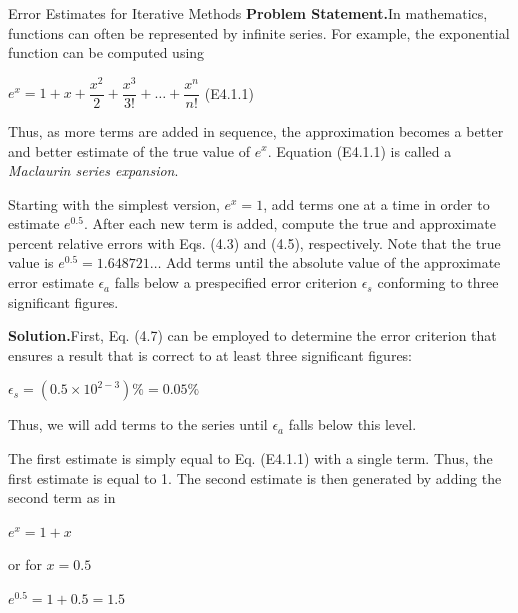 \documentclass[../main.tex]{subfiles}
\begin{document}
\begin{example} Error Estimates for Iterative Methods
    \bigskip
    \newline
    \textbf{Problem Statement.}\quad In mathematics, functions can often be represented by infinite series.
    For example, the exponential function can be computed using
    \newline
    
    $e^x = 1+x+\dfrac{x^2}{2}+\dfrac{x^3}{3!}+\hdots+\dfrac{x^n}{n!}$
    \hfill (E4.1.1)
    \newline

    \noindent
    Thus, as more terms are added in sequence, the approximation becomes a better and better
    estimate of the true value of $e^x$. Equation (E4.1.1) is called a \emph{Maclaurin series expansion}.

    Starting with the simplest version, $e^x = 1$, add terms one at a time in order to estimate
    $e^{0.5}$. After each new term is added, compute the true and approximate percent relative errors
    with Eqs. (4.3) and (4.5), respectively. Note that the true value is $e^{0.5} = 1.648721\dots$ Add
    terms until the absolute value of the approximate error estimate $\epsilon_a$ falls below a prespecified
    error criterion $\epsilon_s$ conforming to three significant figures.
    \newline

    \noindent
    \textbf{Solution.}\quad First, Eq. (4.7) can be employed to determine the error criterion that ensures a
    result that is correct to at least three significant figures:
    \newline

    $\epsilon_s = (0.5\times10^{2-3})\%=0.05\%$
    \newline

    \noindent
    Thus, we will add terms to the series until $\epsilon_a$ falls below this level.
    
    The first estimate is simply equal to Eq. (E4.1.1) with a single term. Thus, the first
    estimate is equal to 1. The second estimate is then generated by adding the second term
    as in
    \newline

    $e^x=1+x$
    \newline

    \noindent
    or for $x=0.5$
    \newline

    $e^{0.5}=1+0.5 = 1.5$
    \newline


\end{example}
\end{document}
